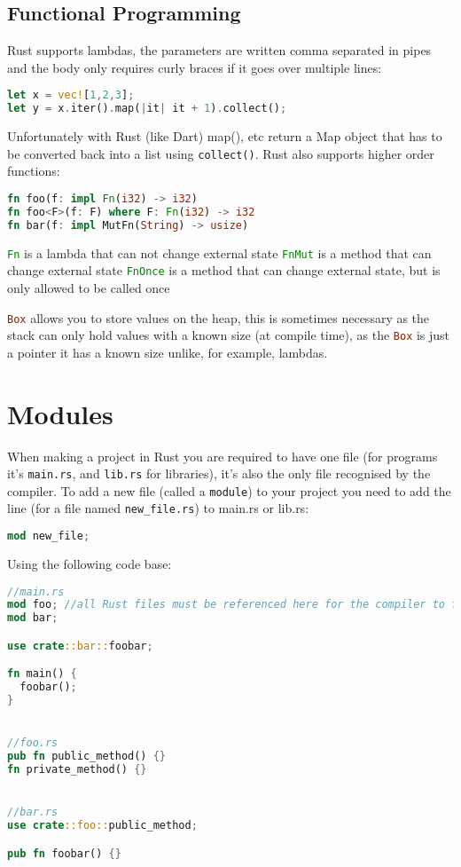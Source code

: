 \documentclass[a4paper,11pt]{article}
\begin{document}
\subsection{Functional Programming}

Rust supports lambdas, the parameters are written comma separated in pipes and the body only requires curly braces if it goes over multiple lines:

\begin{lstlisting}[language=Rust,frame=single]
let x = vec![1,2,3]; 
let y = x.iter().map(|it| it + 1).collect();
\end{lstlisting}
Unfortunately with Rust (like Dart) map(), etc return a Map object that has to be converted back into a list using \lstinline[language=Rust]{collect()}.
\newline
Rust also supports higher order functions:
\begin{lstlisting}[language=Rust,frame=single]
fn foo(f: impl Fn(i32) -> i32)
fn foo<F>(f: F) where F: Fn(i32) -> i32
fn bar(f: impl MutFn(String) -> usize)
\end{lstlisting}

\lstinline[language=Rust]{Fn} is a lambda that can not change external state
\newline
\lstinline[language=Rust]{FnMut} is a method that can change external state
\newline
\lstinline[language=Rust]{FnOnce} is a method that can change external state, but is only allowed to be called once

\lstinline[language=Rust]{Box} allows you to store values on the heap, this is sometimes necessary as the stack can only hold values with a known size (at compile time), as the \lstinline[language=Rust]{Box} is just a pointer it has a known size unlike, for example, lambdas.
\newpage
\section{Modules}
When making a project in Rust you are required to have one file (for programs it's \lstinline{main.rs}, and \lstinline{lib.rs} for libraries), it's also the only file recognised by the compiler. To add a new file (called a \lstinline{module}) to your project you need to add the line (for a file named \lstinline{new_file.rs}) to main.rs or lib.rs:
\begin{lstlisting}[language=Rust,frame=single]
mod new_file;
\end{lstlisting}

Using the following code base:
\begin{lstlisting}[language=Rust,frame=single]
//main.rs 
mod foo; //all Rust files must be referenced here for the compiler to find them
mod bar;

use crate::bar::foobar;

fn main() {
  foobar();
}


//foo.rs
pub fn public_method() {}
fn private_method() {}


//bar.rs
use crate::foo::public_method;

pub fn foobar() {}
\end{lstlisting}
\end{document}
